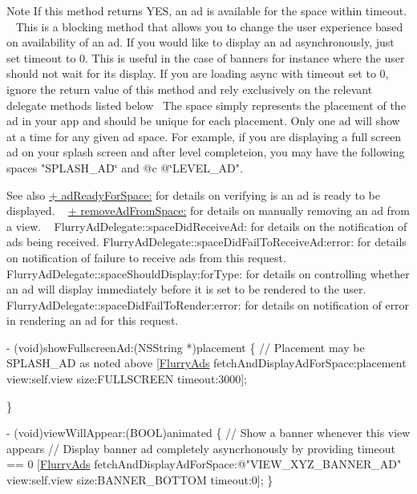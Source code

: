 \begin{DoxyNote}{Note}
If this method returns Y\+ES, an ad is available for the space within {\ttfamily timeout}. ~\newline
 This is a blocking method that allows you to change the user experience based on availability of an ad. If you would like to display an ad asynchronously, just set timeout to 0. This is useful in the case of banners for instance where the user should not wait for its display. If you are loading async with timeout set to 0, ignore the return value of this method and rely exclusively on the relevant delegate methods listed below~\newline
 The {\ttfamily space} simply represents the placement of the ad in your app and should be unique for each placement. Only one ad will show at a time for any given ad space. For example, if you are displaying a full screen ad on your splash screen and after level completeion, you may have the following spaces {\ttfamily "S\+P\+L\+A\+S\+H\+\_\+\+AD\char`\"{} and @c @\char`\"{}L\+E\+V\+E\+L\+\_\+\+AD"}.
\end{DoxyNote}
\begin{DoxySeeAlso}{See also}
\hyperlink{interfaceFlurryAds_a1f87cd568f71e77a9c89264b165d2164}{+ ad\+Ready\+For\+Space\+:} for details on verifying is an ad is ready to be displayed. ~\newline
 \hyperlink{interfaceFlurryAds_aaf30e23048de55a1adb8a2c067428be6}{+ remove\+Ad\+From\+Space\+:} for details on manually removing an ad from a view. ~\newline
 Flurry\+Ad\+Delegate\+::space\+Did\+Receive\+Ad\+: for details on the notification of ads being received. Flurry\+Ad\+Delegate\+::space\+Did\+Fail\+To\+Receive\+Ad\+:error\+: for details on notification of failure to receive ads from this request. Flurry\+Ad\+Delegate\+::space\+Should\+Display\+:for\+Type\+: for details on controlling whether an ad will display immediately before it is set to be rendered to the user. Flurry\+Ad\+Delegate\+::space\+Did\+Fail\+To\+Render\+:error\+: for details on notification of error in rendering an ad for this request.
\end{DoxySeeAlso}

\begin{DoxyCode}
   - (void)showFullscreenAd:(NSString *)placement
\{
\textcolor{comment}{// Placement may be SPLASH\_AD as noted above}
[\hyperlink{interfaceFlurryAds}{FlurryAds} fetchAndDisplayAdForSpace:placement view:\textcolor{keyword}{self}.view size:FULLSCREEN timeout:3000];

\}

- (void)viewWillAppear:(BOOL)animated
\{
\textcolor{comment}{// Show a banner whenever this view appears}
\textcolor{comment}{// Display banner ad completely asyncrhonously by providing timeout == 0}
[\hyperlink{interfaceFlurryAds}{FlurryAds} fetchAndDisplayAdForSpace:\textcolor{stringliteral}{@"VIEW\_XYZ\_BANNER\_AD"} view:\textcolor{keyword}{self}.view size:BANNER\_BOTTOM 
      timeout:0];
\}
\end{DoxyCode}



